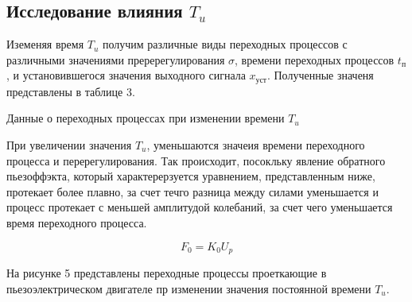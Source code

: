 \documentclass[a4paper, 12pt]{article}
\begin{document}
\newpage
\begin{center}
\section{Исследование влияния $T_u$}
\end{center} \par
Иземеняя время $T_u$ получим различные виды переходных процессов с различными значениями преререгулирования $\sigma$, времени переходных процессов $t_\text{п}$, и установившегося значения выходного сигнала $x_\text{уст}$. Полученные значеня представлены в таблице 3.
\begin{table}[h!]
    \centering
    \begin{threeparttable}
        \caption{Данные о переходных процессах при изменении времени $T_u$}
    \end{threeparttable}
\end{table} \par
При увеличении значения $T_u$, уменьшаются значеия времени переходного процесса и перерегулирования. Так происходит, посокльку явление обратного пьезоффэкта, который характерерзуется уравнением, представленным ниже, протекает более плавно, за счет течго разница между силами уменьшается и процесс протекает с меньшей амплитудой колебаний, за счет чего уменьшается время переходного процесса. \par
\begin{equation*}
    F_0 = K_0U_p
\end{equation*} \par
На рисунке 5 представлены переходные процессы проеткающие в пьезоэлектрическом двигателе пр изменении значения постоянной времени $T_u$.
\end{document}
